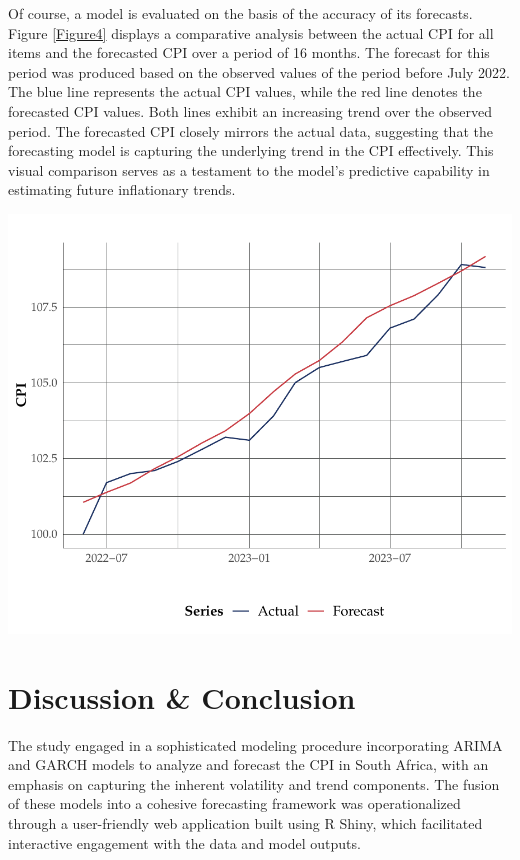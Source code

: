 \documentclass[11pt,preprint, authoryear]{elsarticle}
\let\origfigure\figure
\let\endorigfigure\endfigure
\renewenvironment{figure}[1][2] {
    \expandafter\origfigure\expandafter[H]
} {
    \endorigfigure
}
\numberwithin{equation}{section}
\numberwithin{figure}{section}
\numberwithin{table}{section}
\begin{document}
Of course, a model is evaluated on the basis of the accuracy of its
forecasts. Figure \ref{Figure4} displays a comparative analysis between
the actual CPI for all items and the forecasted CPI over a period of 16
months. The forecast for this period was produced based on the observed
values of the period before July 2022. The blue line represents the
actual CPI values, while the red line denotes the forecasted CPI values.
Both lines exhibit an increasing trend over the observed period. The
forecasted CPI closely mirrors the actual data, suggesting that the
forecasting model is capturing the underlying trend in the CPI
effectively. This visual comparison serves as a testament to the model's
predictive capability in estimating future inflationary trends.

\begin{figure}
\centering
\includegraphics{FMX-Proj-Write_Up_files/figure-latex/evaluation-1.pdf}
\caption{Forecasted CPI vs Actual CPI. Forecasted values in red and
actual values in blue. \label{Figure4}}
\end{figure}

\hypertarget{discussion-conclusion}{%
\section{Discussion \& Conclusion}\label{discussion-conclusion}}

The study engaged in a sophisticated modeling procedure incorporating
ARIMA and GARCH models to analyze and forecast the CPI in South Africa,
with an emphasis on capturing the inherent volatility and trend
components. The fusion of these models into a cohesive forecasting
framework was operationalized through a user-friendly web application
built using R Shiny, which facilitated interactive engagement with the
data and model outputs.
\end{document}

